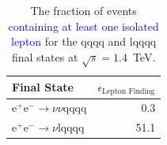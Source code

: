 \begin{table}[h!]
\centering
\begin{tabular}{ l r }
\hline
Final State & $\epsilon_{\text{Lepton Finding}}$ \\ 
\hline
$\text{e}^{+}\text{e}^{-} \rightarrow \nu{\nu}\text{qqqq}$ & 0.3 \\
$\text{e}^{+}\text{e}^{-} \rightarrow \nu\text{lqqqq}$ & 51.1 \\
\hline
\end{tabular}
\caption[The fraction of events \textcolor{blue}{containing at least one isolated lepton} for the {\nu}{\nu}qqqq and {\nu}lqqqq final states at $\sqrt{s}=1.4$~TeV.]{The fraction of events \textcolor{blue}{containing at least one isolated lepton} for the {\nu}{\nu}qqqq and {\nu}lqqqq final states at $\sqrt{s}=1.4$~TeV.}
\label{table:efficiencyleptonfinding}
\end{table}


